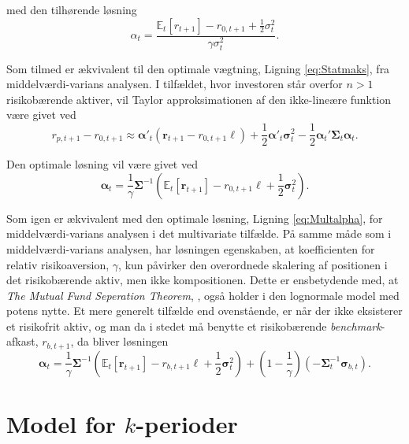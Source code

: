 \documentclass[
  a4paper,
  oneside]{memoir}
\begin{document}
med den tilhørende løsning
\begin{equation}
\alpha_t=\frac{\mathbb{E}_t[r_{t+1}] - r_{0,t+1}+\frac{1}{2}\sigma_t^2}{\gamma\sigma_t^2}.
\end{equation}

Som tilmed er ækvivalent til den optimale vægtning, Ligning \eqref{eq:Statmaks}, fra middelværdi-varians analysen. I tilfældet, hvor investoren står overfor \(n>1\) risikobærende aktiver, vil Taylor approksimationen af den ikke-lineære funktion være givet ved
\begin{equation}
r_{p,t+1}-r_{0,t+1}\approx \bm{\alpha}'_t (\bm{r}_{t+1}-r_{0,t+1}\bm{\ell})+\frac{1}{2}\bm{\alpha}'_t\bm{\sigma}_t^2 - \frac{1}{2} \bm{\alpha}_t'\bm{\Sigma}_t\bm{\alpha}_t. \label{eq:Multtaylor}
\end{equation}

Den optimale løsning vil være givet ved
\begin{equation}
\bm{\alpha}_t=\frac{1}{\gamma}\bm{\Sigma}^{-1}\left(\mathbb{E}_t[\bm{r}_{t+1}]-r_{0,t+1}\bm{\ell}+\frac{1}{2}\bm{\sigma}_t^2\right).\label{eq:Potmultalpha}
\end{equation}

Som igen er ækvivalent med den optimale løsning, Ligning \eqref{eq:Multalpha}, for middelværdi-varians analysen i det multivariate tilfælde. På samme måde som i middelværdi-varians analysen, har løsningen egenskaben, at koefficienten for relativ risikoaversion, \(\gamma\), kun påvirker den overordnede skalering af positionen i det risikobærende aktiv, men ikke kompositionen. Dette er ensbetydende med, at \textit{The Mutual Fund Seperation Theorem}, \citep{Tobin1958}, også holder i den lognormale model med potens nytte. Et mere generelt tilfælde end ovenstående, er når der ikke eksisterer et risikofrit aktiv, og man da i stedet må benytte et risikobærende \emph{benchmark}-afkast, \(r_{b,t+1}\), da bliver løsningen
\begin{equation*}
\bm{\alpha}_t=\frac{1}{\gamma}\bm{\Sigma}^{-1}\left(\mathbb{E}_t[\bm{r}_{t+1}]-r_{b,t+1}\bm{\ell}+\frac{1}{2}\bm{\sigma}_t^2\right)+\left(1-\frac{1}{\gamma}\right)\left(-\bm{\Sigma}_t^{-1}\bm{\sigma}_{b,t}\right).
\end{equation*}

\hypertarget{modkper}{%
\section{\texorpdfstring{Model for \(k\)-perioder}{Model for k-perioder}}\label{modkper}}
\end{document}
